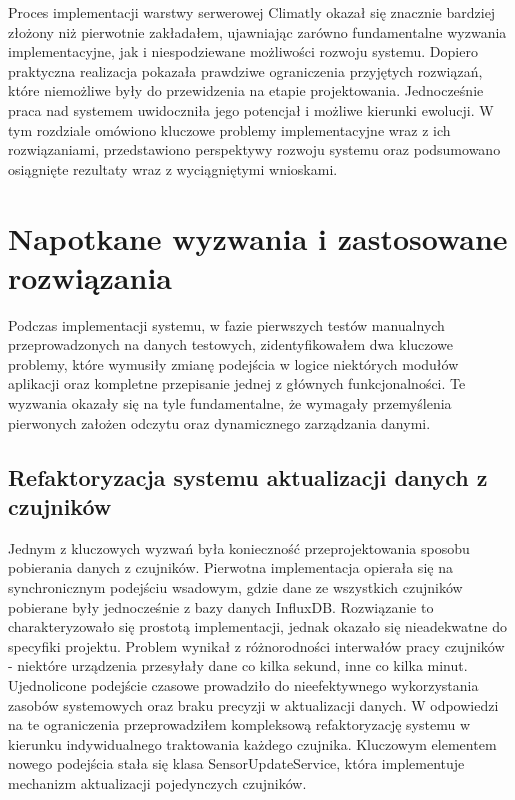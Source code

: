 \documentclass[a4paper,12pt,openany]{book}
\begin{document}
Proces implementacji warstwy serwerowej Climatly okazał się znacznie bardziej złożony niż pierwotnie zakładałem, ujawniając zarówno fundamentalne wyzwania implementacyjne, jak i niespodziewane możliwości rozwoju systemu. Dopiero praktyczna realizacja pokazała prawdziwe ograniczenia przyjętych rozwiązań, które niemożliwe były do przewidzenia na etapie projektowania. Jednocześnie praca nad systemem uwidoczniła jego potencjał i możliwe kierunki ewolucji. W tym rozdziale omówiono kluczowe problemy implementacyjne wraz z ich rozwiązaniami, przedstawiono perspektywy rozwoju systemu oraz podsumowano osiągnięte rezultaty wraz z  wyciągniętymi wnioskami.

\section{Napotkane wyzwania i zastosowane rozwiązania}

Podczas implementacji systemu, w fazie pierwszych testów manualnych przeprowadzonych na danych testowych, zidentyfikowałem dwa kluczowe problemy, które wymusiły zmianę podejścia w logice niektórych modułów aplikacji oraz kompletne przepisanie jednej z głównych funkcjonalności. Te wyzwania okazały się na tyle fundamentalne, że wymagały przemyślenia pierwonych założen odczytu oraz dynamicznego zarządzania danymi.

\subsection*{Refaktoryzacja systemu aktualizacji danych z czujników}

Jednym z kluczowych wyzwań była konieczność przeprojektowania sposobu pobierania danych z czujników. Pierwotna implementacja opierała się na synchronicznym podejściu wsadowym, gdzie dane ze wszystkich czujników pobierane były jednocześnie z bazy danych InfluxDB. Rozwiązanie to charakteryzowało się prostotą implementacji, jednak okazało się nieadekwatne do specyfiki projektu.
Problem wynikał z różnorodności interwałów pracy czujników - niektóre urządzenia przesyłały dane co kilka sekund, inne co kilka minut. Ujednolicone podejście czasowe prowadziło do nieefektywnego wykorzystania zasobów systemowych oraz braku precyzji w aktualizacji danych.
W odpowiedzi na te ograniczenia przeprowadziłem kompleksową refaktoryzację systemu w kierunku indywidualnego traktowania każdego czujnika. Kluczowym elementem nowego podejścia stała się klasa SensorUpdateService, która implementuje mechanizm aktualizacji pojedynczych czujników.
\end{document}
